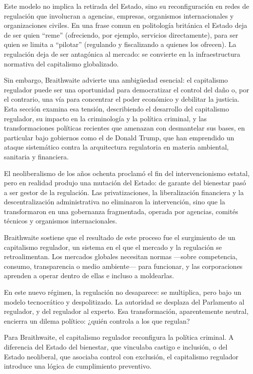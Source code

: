 \documentclass[
  spanish,
  letterpaper,
  DIV=11,
  numbers=noendperiod]{scrreprt}
\begin{document}
Este modelo no implica la retirada del Estado, sino su reconfiguración
en redes de regulación que involucran a agencias, empresas, organismos
internacionales y organizaciones civiles. En una frase comun en
politología británica el Estado deja de ser quien ``reme'' (ofreciendo,
por ejemplo, servicios directamente), para ser quien se limita a
``pilotar'' (regulando y fiscalizando a quienes los ofrecen). La
regulación deja de ser antagónica al mercado: se convierte en la
infraestructura normativa del capitalismo globalizado.

Sin embargo, Braithwaite advierte una ambigüedad esencial: el
capitalismo regulador puede ser una oportunidad para democratizar el
control del daño o, por el contrario, una vía para concentrar el poder
económico y debilitar la justicia. Esta sección examina esa tensión,
describiendo el desarrollo del capitalismo regulador, su impacto en la
criminología y la política criminal, y las transformaciones políticas
recientes que amenazan con desmantelar sus bases, en particular bajo
gobiernos como el de Donald Trump, que han emprendido un ataque
sistemático contra la arquitectura regulatoria en materia ambiental,
sanitaria y financiera.

El neoliberalismo de los años ochenta proclamó el fin del
intervencionismo estatal, pero en realidad produjo una mutación del
Estado: de garante del bienestar pasó a ser gestor de la regulación. Las
privatizaciones, la liberalización financiera y la descentralización
administrativa no eliminaron la intervención, sino que la transformaron
en una gobernanza fragmentada, operada por agencias, comités técnicos y
organismos internacionales.

Braithwaite sostiene que el resultado de este proceso fue el surgimiento
de un capitalismo regulador, un sistema en el que el mercado y la
regulación se retroalimentan. Los mercados globales necesitan normas
---sobre competencia, consumo, transparencia o medio ambiente--- para
funcionar, y las corporaciones aprenden a operar dentro de ellas e
incluso a moldearlas.

En este nuevo régimen, la regulación no desaparece: se multiplica, pero
bajo un modelo tecnocrático y despolitizado. La autoridad se desplaza
del Parlamento al regulador, y del regulador al experto. Esa
transformación, aparentemente neutral, encierra un dilema político:
¿quién controla a los que regulan?

Para Braithwaite, el capitalismo regulador reconfigura la política
criminal. A diferencia del Estado del bienestar, que vinculaba castigo e
inclusión, o del Estado neoliberal, que asociaba control con exclusión,
el capitalismo regulador introduce una lógica de cumplimiento
preventivo.
\end{document}
